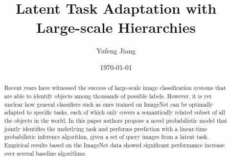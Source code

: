\documentclass[10pt,twocolumn,letterpaper]{article}
\begin{document}
\title{Latent Task Adaptation with Large-scale Hierarchies}
\author{Yufeng Jiang}
\date{\today}
\maketitle
\begin{abstract}
Recent years have witnessed the success of large-scale image classification systems that are able to identify objects among thousands of possible labels. However, it is yet unclear how general classifiers such as ones trained on ImageNet can be optimally adapted to specific tasks, each of which only covers a semantically related subset of all the objects in the world. In this paper authors propose a novel probabilistic model that jointly identifies the underlying task and performs prediction with a linear-time probabilistic inference algorithm, given a set of query images from a latent task. Empirical results based on the ImageNet data showed significant performance increase over several baseline algorithms.
\end{abstract}
\end{document}

